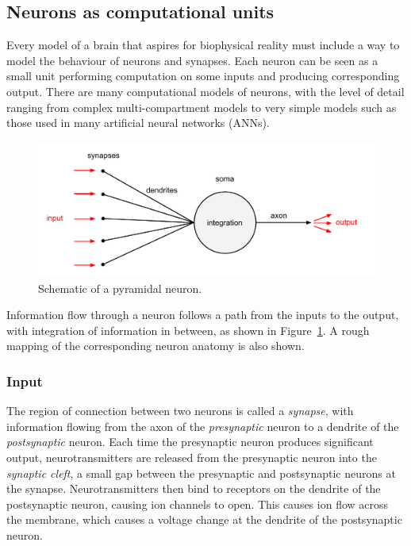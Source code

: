 \documentclass[a4paper,12pt]{report}
\theoremstyle{definition}
\begin{document}
\subsection{Neurons as computational units}
Every model of a brain that aspires for biophysical reality must include a way to model the behaviour of neurons and synapses. Each neuron can be seen as a small unit performing computation on some inputs and producing corresponding output. There are many computational models of neurons, with the level of detail ranging from complex multi-compartment models to very simple models such as those used in many artificial neural networks (ANNs). 

\begin{figure}[h]
    \includegraphics[width=\textwidth]{figures/fig1.pdf}
    \caption{Schematic of a pyramidal neuron.}
    \label{fig:pyramidal}
\end{figure}

Information flow through a neuron follows a path from the inputs to the output, with integration of information in between, as shown in Figure~\ref{fig:pyramidal}. A rough mapping of the corresponding neuron anatomy is also shown.


\subsubsection{Input}

The region of connection between two neurons is called a \emph{synapse}, with information flowing from the axon of the \emph{presynaptic} neuron to a dendrite of the \emph{postsynaptic} neuron. Each time the presynaptic neuron produces significant output, neurotransmitters are released from the presynaptic neuron into the \emph{synaptic cleft}, a small gap between the presynaptic and postsynaptic neurons at the synapse.
Neurotransmitters then bind to receptors on the dendrite of the postsynaptic neuron, causing ion channels to open. This causes ion flow across the membrane, which causes a voltage change at the dendrite of the postsynaptic neuron.
\end{document}
